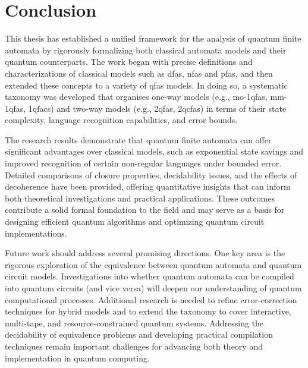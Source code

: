 \chapter{Conclusion}
\label{chap:conclusion}

This thesis has established a unified framework for the analysis of quantum finite automata by rigorously formalizing both classical automata models and their quantum counterparts. The work began with precise definitions and characterizations of classical models such as \glspl{dfa}, \glspl{nfa} and \glspl{pfa}, and then extended these concepts to a variety of \glspl{qfa} models. In doing so, a systematic taxonomy was developed that organises one-way models (e.g., \glspl{mo-1qfa}, \glspl{mm-1qfa}, \glspl{1qfac}) and two-way models (e.g., \glspl{2qfa}, \glspl{2qcfa}) in terms of their state complexity, language recognition capabilities, and error bounds.

The research results demonstrate that quantum finite automata can offer significant advantages over classical models, such as exponential state savings and improved recognition of certain non-regular languages under bounded error. Detailed comparisons of closure properties, decidability issues, and the effects of decoherence have been provided, offering quantitative insights that can inform both theoretical investigations and practical applications. These outcomes contribute a solid formal foundation to the field and may serve as a basis for designing efficient quantum algorithms and optimizing quantum circuit implementations.

Future work should address several promising directions. One key area is the rigorous exploration of the equivalence between quantum automata and quantum circuit models. Investigations into whether quantum automata can be compiled into quantum circuits (and vice versa) will deepen our understanding of quantum computational processes. Additional research is needed to refine error-correction techniques for hybrid models and to extend the taxonomy to cover interactive, multi-tape, and resource-constrained quantum systems. Addressing the decidability of equivalence problems and developing practical compilation techniques remain important challenges for advancing both theory and implementation in quantum computing.
